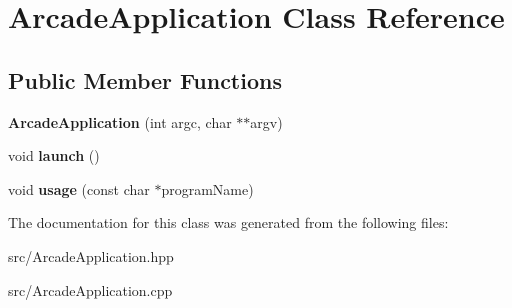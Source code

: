 \hypertarget{class_arcade_application}{}\section{Arcade\+Application Class Reference}
\label{class_arcade_application}
\subsection*{Public Member Functions}
\begin{DoxyCompactItemize}
\item 
\mbox{\label{class_arcade_application_a00c0b25e8f1d5a5ea1999505983ca6f0}} 
{\bfseries Arcade\+Application} (int argc, char $\ast$$\ast$argv)
\item 
\mbox{\label{class_arcade_application_a76384cdd0e3f9df4aee842a661f311d5}} 
void {\bfseries launch} ()
\item 
\mbox{\label{class_arcade_application_a10c9484628fd182c4caaf9f7da9dc47e}} 
void {\bfseries usage} (const char $\ast$program\+Name)
\end{DoxyCompactItemize}


The documentation for this class was generated from the following files\+:\begin{DoxyCompactItemize}
\item 
src/Arcade\+Application.\+hpp\item 
src/Arcade\+Application.\+cpp\end{DoxyCompactItemize}
